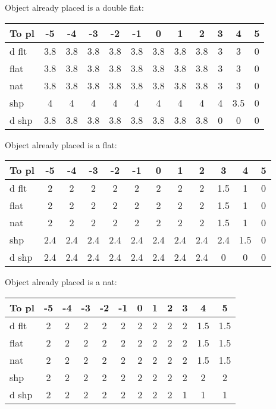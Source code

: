 Object already placed is a double flat:

{\small\begin{tabular}{|l|c|c|c|c|c|c|c|c|c|c|c|}
\hline
 To pl &  -5 &  -4 &  -3 &  -2 &  -1 &   0 &   1 &   2 &   3 &   4 &   5\\
\hline
 d flt &  3.8 &3.8 &3.8 &3.8 &3.8 &3.8 &3.8 &3.8 &  3 &  3 &  0\\
\hline
  flat &  3.8 &3.8 &3.8 &3.8 &3.8 &3.8 &3.8 &3.8 &  3 &  3 &  0\\
\hline
   nat &  3.8 &3.8 &3.8 &3.8 &3.8 &3.8 &3.8 &3.8 &  3 &  3 &  0\\
\hline
   shp &    4 &  4 &  4 &  4 &  4 &  4 &  4 &  4 &  4 &3.5 &  0\\
\hline
 d shp & 3.8 &3.8 &3.8 &3.8 &3.8 &3.8 &3.8 &3.8 &  0 &  0 &  0\\
\hline
\end{tabular}}

Object already placed is a flat:

{\small\begin{tabular}{|l|c|c|c|c|c|c|c|c|c|c|c|}
\hline
 To pl &  -5 &  -4 &  -3 &  -2 &  -1 &   0 &   1 &   2 &   3 &   4 &   5\\
\hline
 d flt &   2 &   2 &   2 &   2 &   2 &   2 &   2 &   2 &1.5 &  1 &  0\\
\hline
  flat &   2 &   2 &   2 &   2 &   2 &   2 &   2 &   2 &1.5 &  1 &  0\\
\hline
   nat &   2 &   2 &   2 &   2 &   2 &   2 &   2 &   2 &1.5 &  1 &  0\\
\hline
   shp & 2.4 & 2.4 & 2.4 &2.4 &2.4 &2.4 &2.4 &2.4 &2.4 &1.5 &  0\\
\hline
 d shp &  2.4 &2.4 &2.4 &2.4 &2.4 &2.4 &2.4 &2.4 &  0 &  0 &  0\\
\hline
\end{tabular}}

Object already placed is a nat:

{\small\begin{tabular}{|l|c|c|c|c|c|c|c|c|c|c|c|}
\hline
 To pl &  -5 &  -4 &  -3 &  -2 &  -1 &   0 &   1 &   2 &   3 &   4 &   5\\
\hline
 d flt &    2 &  2 &   2 &   2 &   2 &   2 &   2 &   2 &   2 &1.5 &1.5\\
\hline
  flat &    2 &  2 &   2 &   2 &   2 &   2 &   2 &   2 &   2 &1.5 &1.5\\
\hline
   nat &    2 &  2 &   2 &   2 &   2 &   2 &   2 &   2 &   2 &1.5 &1.5\\
\hline
   shp &    2 &  2 &   2 &   2 &   2 &   2 &   2 &   2 &   2 &   2 &   2\\
\hline
 d shp &    2 &  2 &   2 &   2 &   2 &   2 &   2 &   2 &  1 &  1 &  1\\
\hline
\end{tabular}}

